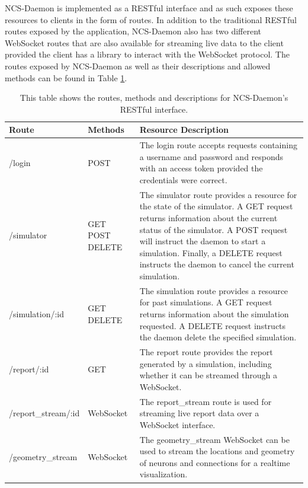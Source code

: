 NCS-Daemon is implemented as a RESTful interface and as such exposes these resources to clients in the form of routes. In addition to the traditional RESTful routes exposed by the application, NCS-Daemon also has two different WebSocket routes that are also available for streaming live data to the client provided the client has a library to interact with the WebSocket protocol. The routes exposed by NCS-Daemon as well as their descriptions and allowed methods can be found in Table \ref{table:routes}.

\begin{table}
\def\arraystretch{1.5}
\begin{tabular}{ l | p{0.75in} | p{3.2in} }
Route & Methods & Resource Description \\
\hline
/login & POST & The login route accepts requests containing a username and password and responds with an access token provided the credentials were correct.  \\
\hline
/simulator & GET POST DELETE & The simulator route provides a resource for the state of the simulator. A GET request returns information about the current status of the simulator. A POST request will instruct the daemon to start a simulation. Finally, a DELETE request instructs the daemon to cancel the current simulation.  \\
\hline
/simulation/:id & GET DELETE & The simulation route provides a resource for past simulations. A GET request returns information about the simulation requested. A DELETE request instructs the daemon delete the specified simulation.  \\
\hline
/report/:id & GET & The report route provides the report generated by a simulation, including whether it can be streamed through a WebSocket.  \\
\hline
/report\_stream/:id & WebSocket & The report\_stream route is used for streaming live report data over a WebSocket interface.  \\
\hline
/geometry\_stream & WebSocket & The geometry\_stream WebSocket can be used to stream the locations and geometry of neurons and connections for a realtime visualization.  \\
\end{tabular}
\caption[REST Interface Routes and Descriptions]{This table shows the routes, methods and descriptions for NCS-Daemon's RESTful interface.\label{table:routes}\vspace{0.25in}}
\end{table}

